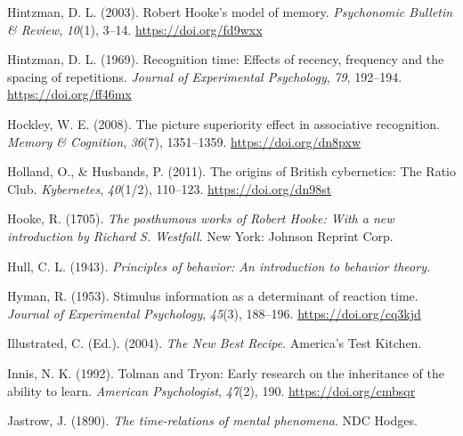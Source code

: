 \documentclass[
  oneside,
  12pt]{crumpbook}
\newlength{\cslhangindent}
\newlength{\cslentryspacingunit} %
\newenvironment{CSLReferences}[2] %
 {%
  \setlength{\parindent}{0pt}
  \ifodd #1
  \let\oldpar\par
  \def\par{\hangindent=\cslhangindent\oldpar}
  \fi
  \setlength{\parskip}{#2\cslentryspacingunit}
 }%
 {}
\begin{document}
\begin{CSLReferences}{1}{0}
\leavevmode{}%
Hintzman, D. L. (2003). Robert {Hooke}'s model of memory. \emph{Psychonomic Bulletin \& Review}, \emph{10}(1), 3--14. \url{https://doi.org/fd9wxx}

\leavevmode{}%
Hintzman, D. L. (1969). Recognition time: {Effects} of recency, frequency and the spacing of repetitions. \emph{Journal of Experimental Psychology}, \emph{79}, 192--194. \url{https://doi.org/ff46mx}

\leavevmode{}%
Hockley, W. E. (2008). The picture superiority effect in associative recognition. \emph{Memory \& Cognition}, \emph{36}(7), 1351--1359. \url{https://doi.org/dn8pxw}

\leavevmode{}%
Holland, O., \& Husbands, P. (2011). The origins of {British} cybernetics: The {Ratio Club}. \emph{Kybernetes}, \emph{40}(1/2), 110--123. \url{https://doi.org/dn98st}

\leavevmode{}%
Hooke, R. (1705). \emph{The posthumous works of {Robert Hooke}: {With} a new introduction by {Richard S}. {Westfall}}. {New York: Johnson Reprint Corp}.

\leavevmode{}%
Hull, C. L. (1943). \emph{Principles of behavior: {An} introduction to behavior theory.}

\leavevmode{}%
Hyman, R. (1953). Stimulus information as a determinant of reaction time. \emph{Journal of Experimental Psychology}, \emph{45}(3), 188--196. \url{https://doi.org/cq3kjd}

\leavevmode{}%
Illustrated, C. (Ed.). (2004). \emph{The {New Best Recipe}}. {America's Test Kitchen}.

\leavevmode{}%
Innis, N. K. (1992). Tolman and {Tryon}: {Early} research on the inheritance of the ability to learn. \emph{American Psychologist}, \emph{47}(2), 190. \url{https://doi.org/cmbsqr}

\leavevmode{}%
Jastrow, J. (1890). \emph{The time-relations of mental phenomena}. {NDC Hodges}.


\end{CSLReferences}
\end{document}
